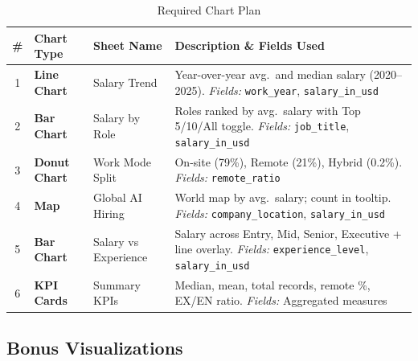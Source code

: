 \documentclass[12pt,a4paper]{article}
\begin{document}
\begin{table}[H]
\centering
\caption{Required Chart Plan}
\small %
\renewcommand{\arraystretch}{1.3} %

\begin{tabularx}{\linewidth}{
  c
  >{\bfseries\RaggedRight\arraybackslash}p{1.9cm}
  >{\RaggedRight\arraybackslash}p{2.1cm}
  X
}
\toprule
\textbf{\#} & \textbf{Chart Type} & \textbf{Sheet Name} & \textbf{Description \& Fields Used} \\
\midrule

1 & Line Chart
  & Salary Trend
  & Year-over-year avg.\ and median salary (2020--2025).
    \newline\textit{Fields:} \texttt{work\_year}, \texttt{salary\_in\_usd} \\

2 & Bar Chart
  & Salary by Role
  & Roles ranked by avg.\ salary with Top 5/10/All toggle.
    \newline\textit{Fields:} \texttt{job\_title}, \texttt{salary\_in\_usd} \\

3 & Donut Chart
  & Work Mode Split
  & On-site (79\%), Remote (21\%), Hybrid (0.2\%).
    \newline\textit{Fields:} \texttt{remote\_ratio} \\

4 & Map
  & Global AI Hiring
  & World map by avg.\ salary; count in tooltip.
    \newline\textit{Fields:} \texttt{company\_location}, \texttt{salary\_in\_usd} \\

5 & Bar Chart
  & Salary vs Experience
  & Salary across Entry, Mid, Senior, Executive + line overlay.
    \newline\textit{Fields:} \texttt{experience\_level}, \texttt{salary\_in\_usd} \\

6 & KPI Cards
  & Summary KPIs
  & Median, mean, total records, remote \%, EX/EN ratio.
    \newline\textit{Fields:} Aggregated measures \\

\bottomrule
\end{tabularx}
\end{table}

\subsection{Bonus Visualizations}
\end{document}
